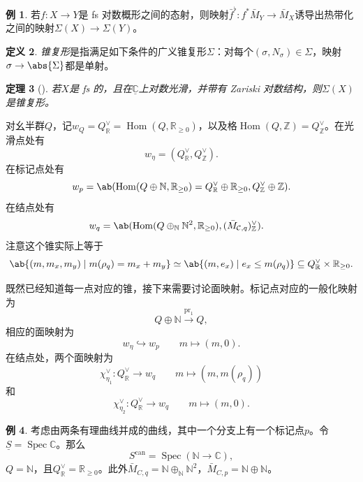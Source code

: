 \documentclass{amsart}
\newtheorem{thm}{定理}[section]
\theoremstyle{definition}
\newtheorem{defn}[thm]{定义}
\newtheorem{exm}[thm]{例}
\theoremstyle{remark}
\theoremstyle{plain}
\theoremstyle{definition}
\theoremstyle{remark}
\newcommand{\N}{\mathbb{N}}
\newcommand{\R}{\mathbb{R}}
\newcommand{\C}{\mathbb{C}}
\newcommand{\Z}{\mathbb{Z}}
\newcommand{\mc}[1]{\mathcal{#1}}
\newcommand{\on}[1]{\operatorname{#1}}
\newcommand{\ul}[1]{\underline{#1}}
\newcommand{\1}{\mathbf{1}}
\newcommand{\2}{\mathbf{2}}
\newcommand{\3}{\mathbf{3}}
\DeclareMathOperator{\Hom}{Hom}
\DeclareMathOperator{\Spec}{Spec}
\begin{document}
\begin{exm}
    若\(f \colon X \to Y\)是 fs 对数概形之间的态射，则映射\(\bar{f}^{\flat} \colon f^* \bar{M}_Y \to \bar{M}_X\)诱导出热带化之间的映射\(\Sigma(X) \to \Sigma(Y)\)。
\end{exm}

\begin{defn}
    \textit{锥复形}是指满足如下条件的广义锥复形\(\Sigma\)：对每个\((\sigma, N_{\sigma}) \in \Sigma\)，映射\(\sigma \to \abs{\Sigma}\)都是单射。
\end{defn}

\begin{thm}[{\cite{ACP2015}}]
    若\(X\)是 fs 的，且在\(\ul{\C}\)上对数光滑，并带有 Zariski 对数结构，则\(\Sigma(X)\)是锥复形。
\end{thm}

对幺半群\(Q\)，记\(w_Q = Q_{\R}^{\vee} = \Hom(Q, \R_{\geq 0})\)，以及格\(\Hom(Q, \Z) = Q_{\Z}^{\vee}\)。在光滑点处有
\[ w_{\eta} = (Q_{\R}^{\vee}, Q_{\Z}^{\vee}). \]
在标记点处有
\[ w_p = \ab(\Hom (Q \oplus \N, \R_{\geq 0}) = Q_{\R}^{\vee} \oplus \R_{\geq 0}, Q_{\Z}^{\vee}\oplus \Z). \]
在结点处有
\begin{align*}
    w_q &= \ab(\Hom(Q \oplus_{\N} \N^2, \R_{\geq 0}), ( \bar{M}_{\mc{C}, q} )_{\Z}^{\vee}).
\end{align*}
注意这个锥实际上等于
\[ \ab\{(m, m_x, m_y) \mid m(\rho_q) = m_x + m_y \} \simeq \ab\{(m, e_x) \mid e_x \leq m(\rho_q) \} \subseteq Q_{\R}^{\vee} \times \R_{\geq 0}. \]

既然已经知道每一点对应的锥，接下来需要讨论面映射。标记点对应的一般化映射为
\[ Q \oplus \N \xrightarrow{\on{pr}_1} Q, \]
相应的面映射为
\[ w_{\eta} \hookrightarrow w_p \qquad m \mapsto (m,0). \]
在结点处，两个面映射为
\[ \chi_{\eta_1}^{\vee} \colon Q_{\R}^{\vee} \to w_q \qquad m \mapsto (m, m(\rho_q)) \]
和
\[ \chi_{\eta_2}^{\vee} \colon Q_{\R}^{\vee} \to w_q \qquad m \mapsto (m, 0). \]

\begin{exm}
    考虑由两条有理曲线并成的曲线，其中一个分支上有一个标记点\(p\)。令\(\ul{S} = \Spec \C\)。那么
    \[ S^{\on{can}} = \Spec(\N \to \C), \]
    \(Q = \N\)，且\(Q_{\R}^{\vee} = \R_{\geq 0}\)。此外\(\bar{M}_{C, q} = \N \oplus_{\N} \N^2\)，\(\bar{M}_{C, p} = \N \oplus \N\)。
\end{exm}
\end{document}
